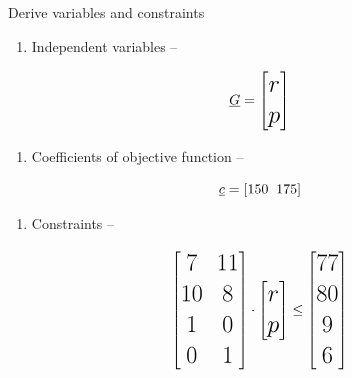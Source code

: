 \documentclass[aspectratio=1610,pdftex,dvipsnames,compress,xcolor={dvipsnames}]{beamer}
\begin{document}
\begin{frame}{Derive variables and constraints}
    \begin{enumerate}[series=outerlist,topsep=0pt,itemsep=1pt,leftmargin=*,label=(\arabic*)]
        \item[]Independent variables --
    \end{enumerate}

    \vspace*{\fill}

    \begin{equation}
        \LARGE
        \underline{G} = \begin{bmatrix} r \\ p \end{bmatrix}
    \end{equation}

    \vspace*{\fill}

    \begin{enumerate}[series=outerlist,topsep=0pt,itemsep=1pt,leftmargin=*,label=(\arabic*)]
        \item[]Coefficients of objective function --
    \end{enumerate}

    \vspace*{\fill}

    \begin{equation}
        \LARGE
        \underline{c} = [150 \; \; 175]
    \end{equation}

    \vspace*{\fill}

    \begin{enumerate}[series=outerlist,topsep=0pt,itemsep=1pt,leftmargin=*,label=(\arabic*)]
        \item[]Constraints --
    \end{enumerate}

    \vspace*{\fill}

    \begin{equation}
        \LARGE
        \begin{bmatrix} 7 & 11 \\ 10 & 8 \\ 1 & 0 \\ 0 & 1 \end{bmatrix}
            \cdot
        \begin{bmatrix} r \\ p \end{bmatrix}
            \leq
        \begin{bmatrix} 77 \\ 80 \\ 9 \\ 6 \end{bmatrix}
    \end{equation}
\end{frame}
\end{document}
